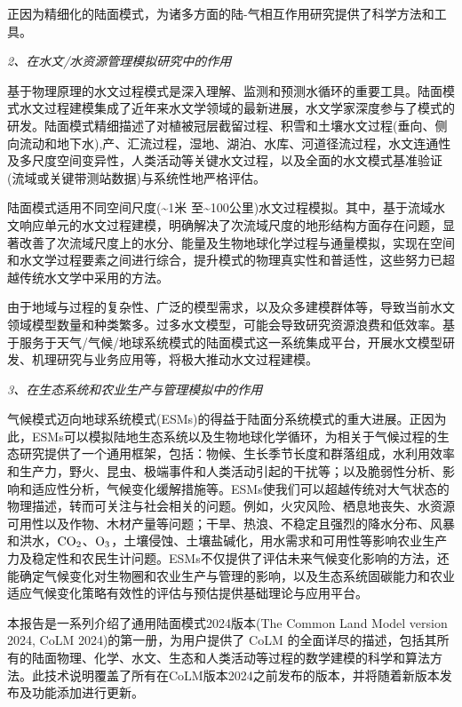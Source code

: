 正因为精细化的陆面模式，为诸多方面的陆-气相互作用研究提供了科学方法和工具。

\textit{2、在水文/水资源管理模拟研究中的作用}

基于物理原理的水文过程模式是深入理解、监测和预测水循环的重要工具。陆面模式水文过程建模集成了近年来水文学领域的最新进展，水文学家深度参与了模式的研发。陆面模式精细描述了对植被冠层截留过程、积雪和土壤水文过程(垂向、侧向流动和地下水),产、汇流过程，湿地、湖泊、水库、河道径流过程，水文连通性及多尺度空间变异性，人类活动等关键水文过程，以及全面的水文模式基准验证(流域或关键带测站数据)与系统性地严格评估。

陆面模式适用不同空间尺度(\textasciitilde1米 至\textasciitilde100公里)水文过程模拟。其中，基于流域水文响应单元的水文过程建模，明确解决了次流域尺度的地形结构方面存在问题，显著改善了次流域尺度上的水分、能量及生物地球化学过程与通量模拟，实现在空间和水文学过程要素之间进行综合，提升模式的物理真实性和普适性，这些努力已超越传统水文学中采用的方法。

由于地域与过程的复杂性、广泛的模型需求，以及众多建模群体等，导致当前水文领域模型数量和种类繁多。过多水文模型，可能会导致研究资源浪费和低效率。基于服务于天气/气候/地球系统模式的陆面模式这一系统集成平台，开展水文模型研发、机理研究与业务应用等，将极大推动水文过程建模。

\textit{3、在生态系统和农业生产与管理模拟中的作用}

气候模式迈向地球系统模式(ESMs)的得益于陆面分系统模式的重大进展。正因为此，ESMs可以模拟陆地生态系统以及生物地球化学循环，为相关于气候过程的生态研究提供了一个通用框架，包括：物候、生长季节长度和群落组成，水利用效率和生产力，野火、昆虫、极端事件和人类活动引起的干扰等；以及脆弱性分析、影响和适应性分析，气候变化缓解措施等。ESMs使我们可以超越传统对大气状态的物理描述，转而可关注与社会相关的问题。例如，火灾风险、栖息地丧失、水资源可用性以及作物、木材产量等问题；干旱、热浪、不稳定且强烈的降水分布、风暴和洪水，$\rm CO_2$、$\rm O_3$，土壤侵蚀、土壤盐碱化，用水需求和可用性等影响农业生产力及稳定性和农民生计问题。ESMs不仅提供了评估未来气候变化影响的方法，还能确定气候变化对生物圈和农业生产与管理的影响，以及生态系统固碳能力和农业适应气候变化策略有效性的评估与预估提供基础理论与应用平台。

本报告是一系列介绍了通用陆面模式2024版本(The Common Land Model version 2024, CoLM 2024)的第一册，为用户提供了 CoLM 的全面详尽的描述，包括其所有的陆面物理、化学、水文、生态和人类活动等过程的数学建模的科学和算法方法。此技术说明覆盖了所有在CoLM版本2024之前发布的版本，并将随着新版本发布及功能添加进行更新。

